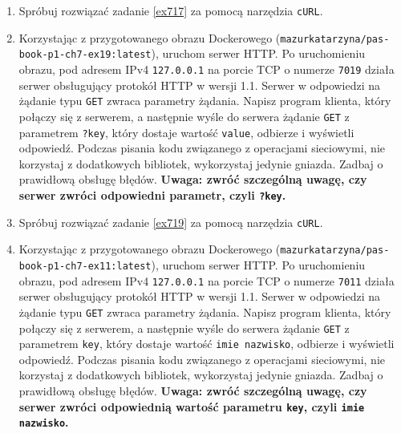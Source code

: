 \documentclass{article}
\begin{document}
\begin{enumerate}[label=\textbf{7.\arabic*}]
\item Spróbuj rozwiązać zadanie \ref{ex717} za pomocą narzędzia \texttt{cURL}.  
\item \label{ex719} Korzystając z przygotowanego obrazu Dockerowego (\texttt{mazurkatarzyna/pas-book-p1-ch7-ex19:latest}), uruchom serwer HTTP.  Po uruchomieniu obrazu, pod adresem IPv4 \texttt{127.0.0.1} na porcie TCP o numerze \texttt{7019} działa serwer obsługujący protokół HTTP w wersji 1.1. Serwer w odpowiedzi na żądanie typu \texttt{GET} zwraca parametry żądania. Napisz program klienta, który połączy się z serwerem, a następnie wyśle do serwera żądanie \texttt{GET} z parametrem \texttt{?key}, który dostaje wartość \texttt{value}, odbierze i wyświetli odpowiedź. Podczas pisania kodu związanego z operacjami sieciowymi, nie korzystaj z dodatkowych bibliotek, wykorzystaj jedynie gniazda. Zadbaj o prawidłową obsługę błędów. \textbf{Uwaga: zwróć szczególną uwagę, czy serwer zwróci odpowiedni parametr, czyli \texttt{?key}.} \
\item Spróbuj rozwiązać zadanie \ref{ex719} za pomocą narzędzia \texttt{cURL}.  
\newpage 
\item \label{ex721} Korzystając z przygotowanego obrazu Dockerowego (\texttt{mazurkatarzyna/pas-book-p1-ch7-ex11:latest}), uruchom serwer HTTP.  Po uruchomieniu obrazu, pod adresem IPv4 \texttt{127.0.0.1} na porcie TCP o numerze \texttt{7011} działa serwer obsługujący protokół HTTP w wersji 1.1. Serwer w odpowiedzi na żądanie typu \texttt{GET} zwraca parametry żądania. Napisz program klienta, który połączy się z serwerem, a następnie wyśle do serwera żądanie \texttt{GET} z parametrem \texttt{key}, który dostaje wartość \texttt{imie nazwisko}, odbierze i wyświetli odpowiedź. Podczas pisania kodu związanego z operacjami sieciowymi, nie korzystaj z dodatkowych bibliotek, wykorzystaj jedynie gniazda. Zadbaj o prawidłową obsługę błędów. \textbf{Uwaga: zwróć szczególną uwagę, czy serwer zwróci odpowiednią wartość parametru \texttt{key}, czyli \texttt{imie nazwisko}.} \

\end{enumerate}
\end{document}
